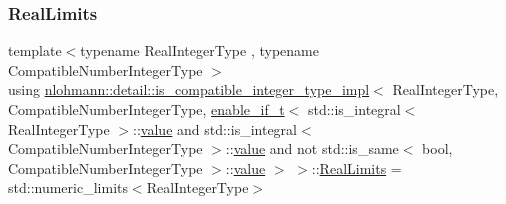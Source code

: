 \subsubsection{\texorpdfstring{Real\+Limits}{RealLimits}}
{\footnotesize\ttfamily template$<$typename Real\+Integer\+Type , typename Compatible\+Number\+Integer\+Type $>$ \\
using \hyperlink{structnlohmann_1_1detail_1_1is__compatible__integer__type__impl}{nlohmann\+::detail\+::is\+\_\+compatible\+\_\+integer\+\_\+type\+\_\+impl}$<$ Real\+Integer\+Type, Compatible\+Number\+Integer\+Type, \hyperlink{namespacenlohmann_1_1detail_a02bcbc878bee413f25b985ada771aa9c}{enable\+\_\+if\+\_\+t}$<$ std\+::is\+\_\+integral$<$ Real\+Integer\+Type $>$\+::\hyperlink{structnlohmann_1_1detail_1_1is__compatible__integer__type__impl_3_01_real_integer_type_00_01_com5aa74bcf254245a639da00509f4d2655_a478242daac7a70e28c749bfec00d1c1b}{value} and std\+::is\+\_\+integral$<$ Compatible\+Number\+Integer\+Type $>$\+::\hyperlink{structnlohmann_1_1detail_1_1is__compatible__integer__type__impl_3_01_real_integer_type_00_01_com5aa74bcf254245a639da00509f4d2655_a478242daac7a70e28c749bfec00d1c1b}{value} and not std\+::is\+\_\+same$<$ bool, Compatible\+Number\+Integer\+Type $>$\+::\hyperlink{structnlohmann_1_1detail_1_1is__compatible__integer__type__impl_3_01_real_integer_type_00_01_com5aa74bcf254245a639da00509f4d2655_a478242daac7a70e28c749bfec00d1c1b}{value} $>$ $>$\+::\hyperlink{structnlohmann_1_1detail_1_1is__compatible__integer__type__impl_3_01_real_integer_type_00_01_com5aa74bcf254245a639da00509f4d2655_a0e9f2586c4de25750563770c9388ab9f}{Real\+Limits} =  std\+::numeric\+\_\+limits$<$Real\+Integer\+Type$>$}



